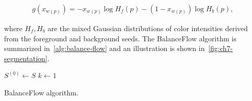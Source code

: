 \begin{align}
  g(x_{w(p)}) = -x_{w(p)}\log{H_f(p)} - (1-x_{w(p)})\log{H_b(p)},
  \label{eq:single-step-data-fidelity}
\end{align}	

where $H_f ,H_b $ are the mixed Gaussian distributions of color intensities derived from the foreground and background seeds. The BalanceFlow algorithm is summarized in~\cref{alg:balance-flow} and an illustration is shown in~\cref{fig:ch7-segmentation}.

\begin{algorithm}
 
 \BlankLine
 $S^{(0)} \longleftarrow S$\;
 $k \longleftarrow 1$\;
 \caption{BalanceFlow algorithm.}
 \label{alg:balance-flow}  
\end{algorithm}


